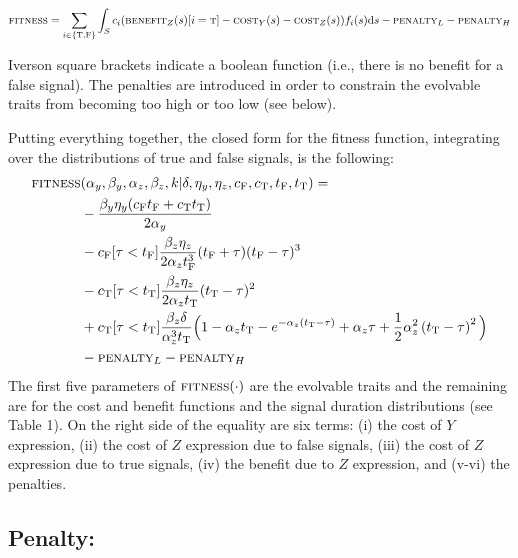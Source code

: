 \documentclass[dvips,12pt,twoside,titlepage]{article}
\newcommand{\ud}{\mathrm{d}}
\begin{document}
\begin{displaymath}
\textsc{fitness} = \sum_{i \in \{\mathrm{T},\mathrm{F}\}} \int_{S}c_{i}(\textsc{benefit}_Z(s)[i=\textsc{t}] - \textsc{cost}_Y(s) - \textsc{cost}_Z(s))f_{i}(s)\ud s
 - \textsc{penalty}_L - \textsc{penalty}_H
\end{displaymath}

\vspace{0.6cm}

\noindent Iverson square brackets indicate a boolean function (i.e., there is no benefit for a false signal). The penalties are introduced in order to constrain the evolvable traits from becoming too high or too low (see below). 

Putting everything together, the closed form for the fitness function, integrating over the distributions of true and false signals, is the following:
\newcommand{\aY}{\alpha_{y}}
\newcommand{\bY}{\beta_{y}}
\newcommand{\aZ}{\alpha_{z}}
\newcommand{\bZ}{\beta_{z}}
\newcommand{\nY}{\eta_{y}}
\newcommand{\nZ}{\eta_{z}}
\newcommand{\cF}{c_{\mathrm{F}}}
\newcommand{\cT}{c_{\mathrm{T}}}
\newcommand{\tF}{t_{\mathrm{F}}}
\newcommand{\tT}{t_{\mathrm{T}}}
\begin{align*}
\textsc{fitness}&(\aY,\bY,\aZ,\bZ,k | \delta,\nY,\nZ,\cF,\cT,\tF,\tT) = \\
& - \frac{\bY \nY (\cF \tF+\cT \tT)}{2 \aY} \\
& - \cF [\tau < \tF]\frac{\bZ \nZ}{2 \aZ \tF^3} (\tF + \tau) (\tF - \tau)^3 \\
& - \cT [\tau < \tT] \frac{\bZ \nZ}{2 \aZ \tT} (\tT - \tau)^2 \\
& + \cT [\tau < \tT]
 \frac{\bZ \delta}{\aZ^3 \tT} \Big(
   1 
   - \aZ \tT
   - e^{-\aZ \left(\tT-\tau\right)}
   + \aZ \tau
   + \frac{1}{2}\aZ^2 \left(\tT-\tau\right)^2
\Big) \\
& - \textsc{penalty}_L - \textsc{penalty}_H
\end{align*}
\noindent The first five parameters of $\textsc{fitness}(\cdot)$ are the evolvable traits and the remaining are for the cost and benefit functions and the signal duration distributions (see Table 1). %
On the right side of the equality are six terms: (i) the cost of $Y$ expression, (ii) the cost of $Z$ expression due to false signals, (iii) the cost of $Z$ expression due to true signals, (iv) the benefit due to $Z$ expression, and (v-vi) the penalties. 

\subsection*{Penalty:}
\end{document}
